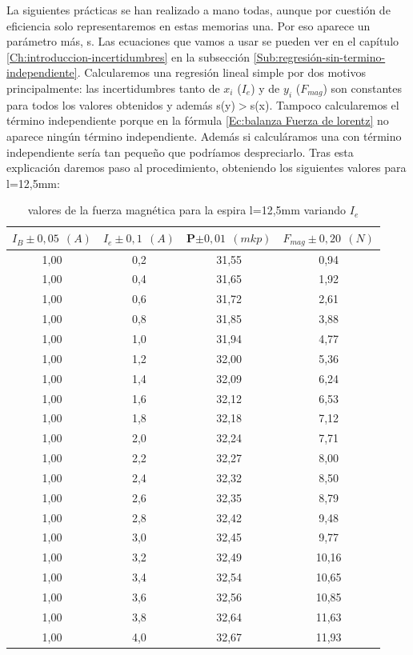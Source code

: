 \documentclass[12pt,a4paper]{book}
\begin{document}
La siguientes prácticas se han realizado a mano todas, aunque por cuestión de eficiencia solo representaremos en estas memorias una. Por eso aparece un parámetro más, s. Las ecuaciones que vamos a usar se pueden ver en el capítulo \ref{Ch:introduccion-incertidumbres} en la subsección \ref{Sub:regresión-sin-termino-independiente}. Calcularemos una regresión lineal simple por dos motivos principalmente: las incertidumbres tanto de $x_i$ ($I_e$) y de $y_i$ ($F_{mag}$) son constantes para todos los valores obtenidos y además s(y)$>$s(x). Tampoco calcularemos el término independiente porque en la fórmula \ref{Ec:balanza Fuerza de lorentz} no aparece ningún término independiente. Además si calculáramos una con término independiente sería tan pequeño que podríamos despreciarlo. Tras esta explicación daremos paso al procedimiento, obteniendo los siguientes valores para l=12,5mm:

\newpage

\vspace*{4.5cm} 

\begin{table}[h!]
\begin{center}
\begin{tabular}{|c|c|c|c|}
\hline
$I_B  \pm 0,05 \ \  (A)$ & 	 $I_e \pm 0,1 \ \ (A) $ & 	 P$ \pm 0,01\ \ (mkp)$ & 	 $F_{mag} \pm 0,20 \ \ (N)$ \\  \hline
1,00 & 	 0,2 & 	 31,55 & 	 0,94 \\
1,00 & 	 0,4 & 	 31,65 & 	 1,92 \\
1,00 & 	 0,6 & 	 31,72 & 	 2,61 \\
1,00 & 	 0,8 & 	 31,85 & 	 3,88 \\
1,00 & 	 1,0 & 	 31,94 & 	 4,77 \\
1,00 & 	 1,2 & 	 32,00 & 	 5,36 \\
1,00 & 	 1,4 & 	 32,09 & 	 6,24 \\
1,00 & 	 1,6 & 	 32,12 & 	 6,53 \\
1,00 & 	 1,8 & 	 32,18 & 	 7,12 \\
1,00 & 	 2,0 & 	 32,24 & 	 7,71 \\
1,00 & 	 2,2 & 	 32,27 & 	 8,00 \\
1,00 & 	 2,4 & 	 32,32 & 	 8,50 \\
1,00 & 	 2,6 & 	 32,35 & 	 8,79 \\
1,00 & 	 2,8 & 	 32,42 & 	 9,48 \\
1,00 & 	 3,0 & 	 32,45 & 	 9,77 \\
1,00 & 	 3,2 & 	 32,49 & 	 10,16 \\
1,00 & 	 3,4 & 	 32,54 & 	 10,65 \\
1,00 & 	 3,6 & 	 32,56 & 	 10,85 \\
1,00 & 	 3,8 & 	 32,64 & 	 11,63 \\
1,00 & 	 4,0 & 	 32,67 & 	 11,93 \\
\hline
\end{tabular}
\end{center}
\caption{valores de la fuerza magnética para la espira l=12,5mm variando $I_e$}
\end{table}
\end{document}
